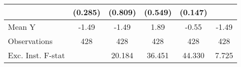 {\begin{tabular}{l*{5}{c}}
            &     (0.285)         &     (0.809)         &     (0.549)         &     (0.147)         &                     \\
\midrule
Mean Y      &       -1.49         &       -1.49         &        1.89         &       -0.55         &       -1.49         \\
Observations&         428         &         428         &         428         &         428         &         428         \\
Exc. Inst. F-stat&                     &      20.184         &      36.451         &      44.330         &       7.725         \\
\bottomrule
\end{tabular}
}

